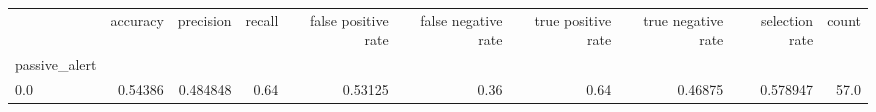 \begin{tabular}{lrrrrrrrrr}
\toprule
{} &  accuracy &  precision &  recall &  false positive rate &  false negative rate &  true positive rate &  true negative rate &  selection rate &  count \\
passive\_alert &           &            &         &                      &                      &                     &                     &                 &        \\
\midrule
0.0           &   0.54386 &   0.484848 &    0.64 &              0.53125 &                 0.36 &                0.64 &             0.46875 &        0.578947 &   57.0 \\
\bottomrule
\end{tabular}
